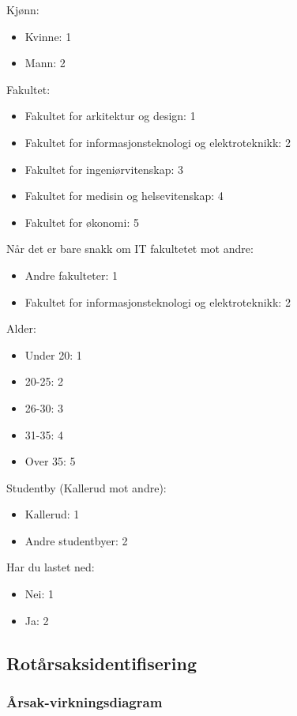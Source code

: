 Kjønn:
\begin{itemize}
    \item Kvinne: 1
    \item Mann: 2
\end{itemize}

Fakultet:
\begin{itemize}
    \item Fakultet for arkitektur og design: 1
    \item Fakultet for informasjonsteknologi og elektroteknikk: 2
    \item Fakultet for ingeniørvitenskap: 3
    \item Fakultet for medisin og helsevitenskap: 4
    \item Fakultet for økonomi: 5
\end{itemize}

Når det er bare snakk om IT fakultetet mot andre:
\begin{itemize}
    \item Andre fakulteter: 1
    \item Fakultet for informasjonsteknologi og elektroteknikk: 2
\end{itemize}

Alder:
\begin{itemize}
    \item Under 20: 1
    \item 20-25: 2
    \item 26-30: 3
    \item 31-35: 4
    \item Over 35: 5
\end{itemize}

Studentby (Kallerud mot andre):
\begin{itemize}
    \item Kallerud: 1
    \item Andre studentbyer: 2
\end{itemize}

Har du lastet ned:
\begin{itemize}
    \item Nei: 1
    \item Ja: 2
\end{itemize}


\subsection{Rotårsaksidentifisering}


\subsubsection{Årsak-virkningsdiagram}

